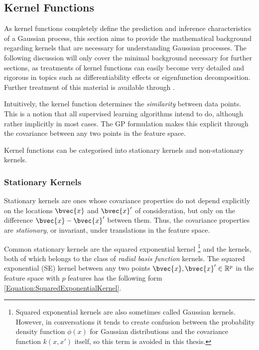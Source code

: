 			\FloatBarrier
			
		\subsection{Kernel Functions}
		\label{Background:GaussianProcesses:KernelFunctions}

			As kernel functions completely define the prediction and inference characteristics of a Gaussian process, this section aims to provide the mathematical background regarding kernels that are necessary for understanding Gaussian processes. The following discussion will only cover the minimal background necessary for further sections, as treatments of kernel functions can easily become very detailed and rigorous in topics such as differentiability effects or eigenfunction decomposition. Further treatment of this material is available through \cite{GaussianProcessForMachineLearning}. 
			
			Intuitively, the kernel function determines the \textit{similarity} between data points. This is a notion that all supervised learning algorithms intend to do, although rather implicitly in most cases. The GP formulation makes this explicit through the covariance between any two points in the feature space.
			
			Kernel functions can be categorised into stationary kernels and non-stationary kernels.
						
			\subsubsection{Stationary Kernels}
			\label{Background:GaussianProcesses:KernelFunctions:Stationary}
			
				Stationary kernels are ones whose covariance properties do not depend explicitly on the locations $\bvec{x}$ and $\bvec{x}'$ of consideration, but only on the difference $\bvec{x} - \bvec{x}'$ between them. Thus, the covariance properties are \textit{stationary}, or invariant, under translations in the feature space.
				
				Common stationary kernels are the squared exponential kernel \footnote{Squared exponential kernels are also sometimes called Gaussian kernels. However, in conversations it tends to create confusion between the probability density function $\phi(x)$ for Gaussian distributions and the covariance function $k(x, x')$ itself, so this term is avoided in this thesis.} and the \matern kernels, both of which belongs to the class of \textit{radial basis function} kernels. The squared exponential (SE) kernel between any two points $\bvec{x}, \bvec{x}' \in \mathbb{R}^{p}$ in the feature space with $p$ features has the following form \eqref{Equation:SquaredExponentialKernel}.
				
